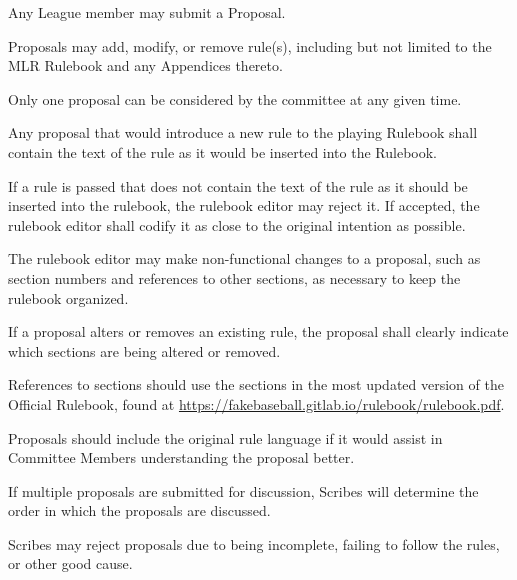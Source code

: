 \begin{deepEnumerate}
    \item Any League member may submit a Proposal.
    \item Proposals may add, modify, or remove rule(s), including but not limited to the MLR Rulebook and any Appendices thereto.
    \item Only one proposal can be considered by the committee at any given time.
    \item Any proposal that would introduce a new rule to the playing Rulebook shall contain the text of the rule as it would be inserted into the Rulebook.
    \begin{deepEnumerate}
        \item If a rule is passed that does not contain the text of the rule as it should be inserted into the rulebook, the rulebook editor may reject it.
        If accepted, the rulebook editor shall codify it as close to the original intention as possible.
        \item The rulebook editor may make non-functional changes to a proposal, such as section numbers and references to other sections, as necessary to keep the rulebook organized.
    \end{deepEnumerate}
    \item If a proposal alters or removes an existing rule, the proposal shall clearly indicate which sections are being altered or removed.
    \begin{deepEnumerate}
        \item References to sections should use the sections in the most updated version of the Official Rulebook, found at \url{https://fakebaseball.gitlab.io/rulebook/rulebook.pdf}.
        \item Proposals should include the original rule language if it would assist in Committee Members understanding the proposal better.
    \end{deepEnumerate}
    \item If multiple proposals are submitted for discussion, Scribes will determine the order in which the proposals are discussed.
    \item Scribes may reject proposals due to being incomplete, failing to follow the rules, or other good cause.
\end{deepEnumerate}

